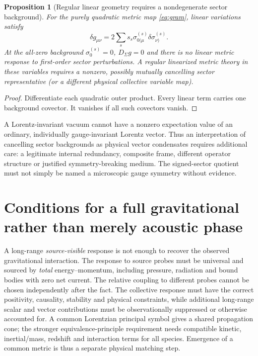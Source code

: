 \documentclass[11pt,a4paper]{article}
\newtheorem{proposition}[theorem]{Proposition}
\theoremstyle{remark}\newtheorem{remark}[theorem]{Remark}
\begin{document}
\begin{proposition}[Regular linear geometry requires a nondegenerate sector background]\label{prop:Jac}
For the purely quadratic metric map \eqref{eq:gram}, linear variations satisfy
\begin{equation}\label{eq:jac}
\boxed{\delta g_{\mu\nu}=2\sum_s s_s\sigma^{(s)}_{0(\mu}\delta\sigma^{(s)}_{\nu)}.}
\end{equation}
At the all-zero background $\sigma_0^{(s)}=0$, $D_\Sigma g=0$ and there is no linear metric response to first-order sector perturbations. A regular linearized metric theory in these variables requires a nonzero, possibly mutually cancelling sector representative (or a different physical collective variable map).
\end{proposition}
\begin{proof}
Differentiate each quadratic outer product. Every linear term carries one background covector. It vanishes if all such covectors vanish.
\end{proof}
A Lorentz-invariant vacuum cannot have a nonzero expectation value of an ordinary, individually gauge-invariant Lorentz vector. Thus an interpretation of cancelling sector backgrounds as physical vector condensates requires additional care: a legitimate internal redundancy, composite frame, different operator structure or justified symmetry-breaking medium. The signed-sector quotient must not simply be named a microscopic gauge symmetry without evidence.

\section{Conditions for a full gravitational rather than merely acoustic phase}
A long-range \emph{source-visible} response is not enough to recover the observed gravitational interaction. The response to source probes must be universal and sourced by \emph{total} energy--momentum, including pressure, radiation and bound bodies with zero net current. The relative coupling to different probes cannot be chosen independently after the fact. The collective response must have the correct positivity, causality, stability and physical constraints, while additional long-range scalar and vector contributions must be observationally suppressed or otherwise accounted for. A common Lorentzian principal symbol gives a shared propagation cone; the stronger equivalence-principle requirement needs compatible kinetic, inertial/mass, redshift and interaction terms for all species. Emergence of a common metric is thus a separate physical matching step.
\end{document}
